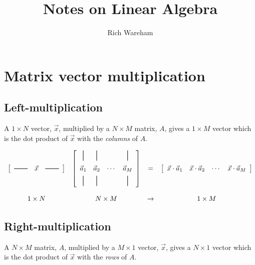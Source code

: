 \documentclass[a4paper]{article}
\title{Notes on Linear Algebra}
\author{Rich Wareham}
\newcommand{\hmatrixrule}{\rule[0.5ex]{2em}{0.7pt}}
\newcommand{\vmatrixrule}{\rule[-0.5ex]{0.7pt}{1.5em}}
\begin{document}
\maketitle

\section{Matrix vector multiplication}

\subsection{Left-multiplication}

A $1 \times N$ vector, $\vec{x}$, multiplied by a $N \times M$ matrix, $A$,
gives a $1 \times M$ vector which is the dot product of $\vec{x}$ with the
\emph{columns} of $A$.

\[
\begin{array}{cccc}
\left[
  \begin{array}{cccc}
    \hmatrixrule & \vec{x} & \hmatrixrule 
  \end{array} \right] &
\left[
	\begin{array}{cccc}
		\vmatrixrule & \vmatrixrule &  & \vmatrixrule \\[1ex]
		\vec{a}_1 & \vec{a}_2 & \cdots & \vec{a}_M \\[1ex]
		\vmatrixrule & \vmatrixrule &  & \vmatrixrule 
	\end{array}
\right] &
= &
\left[ \begin{array}{cccc}
	\vec{x} \cdot \vec{a}_1 & \vec{x} \cdot \vec{a}_2 & \cdots & \vec{x} \cdot \vec{a}_M
      \end{array} \right] 
\\
\rule{0pt}{2em} 1 \times N & N \times M & \rightarrow & 1 \times M
\end{array}
\]

\subsection{Right-multiplication}

A $N \times M$ matrix, $A$, multiplied by a $M \times 1$ vector, $\vec{x}$,
gives a $N \times 1$ vector which is the dot product of $\vec{x}$ with the
\emph{rows} of $A$.
\end{document}
